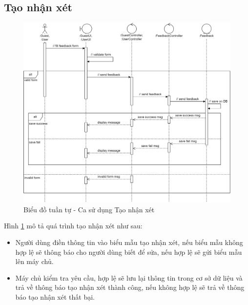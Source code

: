 \documentclass[./../main.tex]{subfiles}
\begin{document}
\subsection{Tạo nhận xét}
\begin{figure}[H]
	\centering
	\includegraphics[width=\linewidth]{./img/uc13.png}
	\caption{\label{tab:seq-uc8}Biểu đồ tuần tự - Ca sử dụng Tạo nhận xét}
\end{figure}
Hình \ref{tab:seq-uc8} mô tả quá trình tạo nhận xét như sau:
\begin{itemize}
    \item Người dùng điền thông tin vào biểu mẫu tạo nhận xét, nếu biểu mẫu không hợp lệ sẽ thông báo cho người dùng biết để sửa, nếu hợp lệ sẽ gửi biểu mẫu lên máy chủ.
    \item Máy chủ kiểm tra yêu cầu, hợp lệ sẽ lưu lại thông tin trong cơ sở dữ liệu và trả về thông báo tạo nhận xét thành công, nếu không hợp lệ sẽ trả về thông báo tạo nhận xét thất bại.
\end{itemize}
\end{document}

